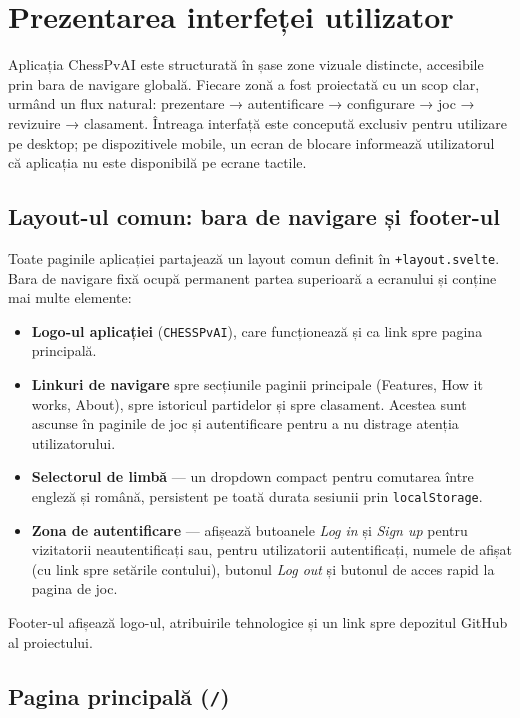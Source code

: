 \documentclass[12pt,a4paper]{article}
\begin{document}
\newpage
\section{Prezentarea interfeței utilizator}

Aplicația ChessPvAI este structurată în șase zone vizuale distincte, accesibile prin bara de navigare globală. Fiecare zonă a fost proiectată cu un scop clar, urmând un flux natural: prezentare → autentificare → configurare → joc → revizuire → clasament. Întreaga interfață este concepută exclusiv pentru utilizare pe desktop; pe dispozitivele mobile, un ecran de blocare informează utilizatorul că aplicația nu este disponibilă pe ecrane tactile.

\subsection{Layout-ul comun: bara de navigare și footer-ul}

Toate paginile aplicației partajează un layout comun definit în \texttt{+layout.svelte}. Bara de navigare fixă ocupă permanent partea superioară a ecranului și conține mai multe elemente:
\begin{itemize}
  \item \textbf{Logo-ul aplicației} (\texttt{CHESSPvAI}), care funcționează și ca link spre pagina principală.
  \item \textbf{Linkuri de navigare} spre secțiunile paginii principale (Features, How it works, About), spre istoricul partidelor și spre clasament. Acestea sunt ascunse în paginile de joc și autentificare pentru a nu distrage atenția utilizatorului.
  \item \textbf{Selectorul de limbă} — un dropdown compact pentru comutarea între engleză și română, persistent pe toată durata sesiunii prin \texttt{localStorage}.
  \item \textbf{Zona de autentificare} — afișează butoanele \textit{Log in} și \textit{Sign up} pentru vizitatorii neautentificați sau, pentru utilizatorii autentificați, numele de afișat (cu link spre setările contului), butonul \textit{Log out} și butonul de acces rapid la pagina de joc.
\end{itemize}

Footer-ul afișează logo-ul, atribuirile tehnologice și un link spre depozitul GitHub al proiectului.

\subsection{Pagina principală (\texttt{/})}
\end{document}
